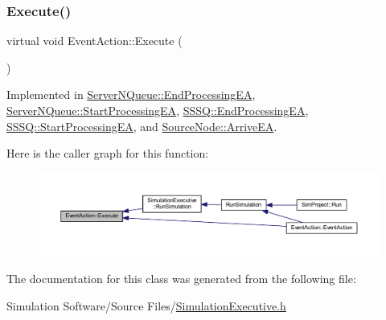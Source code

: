 \subsubsection{\texorpdfstring{Execute()}{Execute()}}
{\footnotesize\ttfamily virtual void Event\+Action\+::\+Execute (\begin{DoxyParamCaption}{ }\end{DoxyParamCaption})\hspace{0.3cm}{\ttfamily [pure virtual]}}



Implemented in \hyperlink{class_server_n_queue_1_1_end_processing_e_a_a58033da71d12b3d61bf4c48f7c470e3d}{Server\+N\+Queue\+::\+End\+Processing\+EA}, \hyperlink{class_server_n_queue_1_1_start_processing_e_a_a734000fd4380b39594df88706f674dd0}{Server\+N\+Queue\+::\+Start\+Processing\+EA}, \hyperlink{class_s_s_s_q_1_1_end_processing_e_a_a58123dc9ac0660bd1da11407e5467968}{S\+S\+S\+Q\+::\+End\+Processing\+EA}, \hyperlink{class_s_s_s_q_1_1_start_processing_e_a_a8734cd511dc7e4fd7f981ed2acb338cb}{S\+S\+S\+Q\+::\+Start\+Processing\+EA}, and \hyperlink{class_source_node_1_1_arrive_e_a_a622b2282aae023818b26d39519143c15}{Source\+Node\+::\+Arrive\+EA}.

Here is the caller graph for this function\+:
\nopagebreak
\begin{figure}[H]
\begin{center}
\leavevmode
\includegraphics[width=350pt]{class_event_action_a62b9d07abb4ca8e7c078b076a1ab1a9f_icgraph}
\end{center}
\end{figure}


The documentation for this class was generated from the following file\+:\begin{DoxyCompactItemize}
\item 
Simulation Software/\+Source Files/\hyperlink{_simulation_executive_8h}{Simulation\+Executive.\+h}\end{DoxyCompactItemize}
